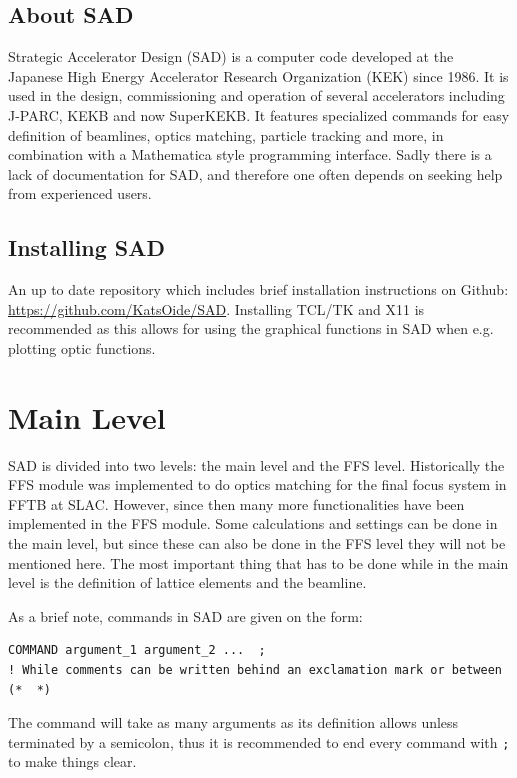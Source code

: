 \documentclass{article}
\begin{document}
\subsection{About SAD}
Strategic Accelerator Design (SAD) is a computer code developed at the Japanese High Energy Accelerator Research Organization (KEK) since 1986. It is used in the design, commissioning and operation of several accelerators including J-PARC, KEKB and now SuperKEKB. It features specialized commands for easy definition of beamlines, optics matching, particle tracking and more, in combination with a Mathematica style programming interface.
Sadly there is a lack of documentation for SAD, and therefore one often depends on seeking help from experienced users.

\subsection{Installing SAD}
An up to date repository which includes brief installation instructions on Github: \url{https://github.com/KatsOide/SAD}.
Installing TCL/TK and X11 is recommended as this allows for using the graphical functions in SAD when e.g. plotting optic functions.

\clearpage


\section{Main Level}
SAD is divided into two levels: the main level and the FFS level. Historically the FFS module was implemented to do optics matching for the final focus system in FFTB at SLAC.
However, since then many more functionalities have been implemented in the FFS module. Some calculations and settings can be done in the main level, but since these can also be done in the FFS level they will not be mentioned here. The most important thing that has to be done while in the main level is the definition of lattice elements and the beamline.

As a brief note, commands in SAD are given on the form: %
\begin{lstlisting}
COMMAND argument_1 argument_2 ...  ;
! While comments can be written behind an exclamation mark or between (*  *)
\end{lstlisting}
The command will take as many arguments as its definition allows unless terminated by a semicolon, thus it is recommended to end every command with \texttt{;} to make things clear.
\end{document}
